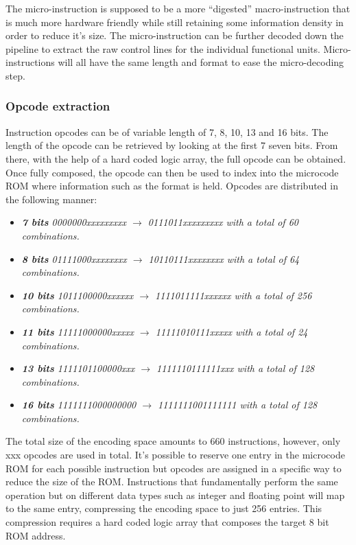 \documentclass{article}
\begin{document}
            The micro-instruction is supposed to be a more ``digested'' macro-instruction that is much more hardware friendly while still retaining some information density in order to reduce it's size. The micro-instruction can be further decoded down the pipeline to extract the raw control lines for the individual functional units. Micro-instructions will all have the same length and format to ease the micro-decoding step.

            \subsubsection{Opcode extraction}

                Instruction opcodes can be of variable length of 7, 8, 10, 13 and 16 bits. The length of the opcode can be retrieved by looking at the first 7 seven bits. From there, with the help of a hard coded logic array, the full opcode can be obtained. Once fully composed, the opcode can then be used to index into the microcode ROM where information such as the format is held. Opcodes are distributed in the following manner:

                \begin{itemize}

                    \item \textit{\textbf{7 bits} 0000000xxxxxxxxx $\rightarrow$ 0111011xxxxxxxxx with a total of 60 combinations.}
                    \item \textit{\textbf{8 bits} 01111000xxxxxxxx $\rightarrow$ 10110111xxxxxxxx with a total of 64 combinations.}
                    \item \textit{\textbf{10 bits} 1011100000xxxxxx $\rightarrow$ 1111011111xxxxxx with a total of 256 combinations.}
                    \item \textit{\textbf{11 bits} 11111000000xxxxx $\rightarrow$ 11111010111xxxxx with a total of 24 combinations.}
                    \item \textit{\textbf{13 bits} 1111101100000xxx $\rightarrow$ 1111110111111xxx with a total of 128 combinations.}
                    \item \textit{\textbf{16 bits} 1111111000000000 $\rightarrow$ 1111111001111111 with a total of 128 combinations.}

                \end{itemize}

                The total size of the encoding space amounts to 660 instructions, however, only xxx opcodes are used in total. It's possible to reserve one entry in the microcode ROM for each possible instruction but opcodes are assigned in a specific way to reduce the size of the ROM. Instructions that fundamentally perform the same operation but on different data types such as integer and floating point will map to the same entry, compressing the encoding space to just 256 entries. This compression requires a hard coded logic array that composes the target 8 bit ROM address.
\end{document}
